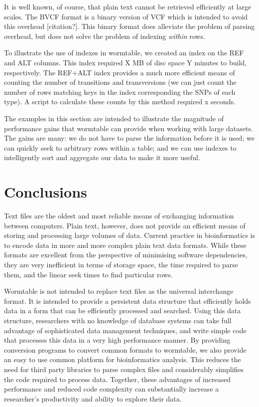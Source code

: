 \documentclass{bioinfo}
\begin{document}
It is well known, of course, that plain text cannot be retrieved 
efficiently at large scales. The BVCF format is a binary version 
of VCF which is intended to avoid this overhead [citation?]. 
This binary format does alleviate the problem of parsing overhead,
but does not solve the problem of indexing \emph{within} rows.

To illustrate the use of indexes in wormtable, we created an index 
on the REF and ALT columns. This index required X MB of disc space 
Y minutes to build, respectively. The REF+ALT index provides a much more 
efficient means of counting the number of transitions and transversions 
(we can just count the number of rows matching keys in the index 
corresponding the SNPs of each type). A script to calculate these 
counts by this method required x seconds. 

The examples in this section are intended to illustrate the 
magnitude of performance gains that wormtable can provide 
when working with large datasets. The gains are many: we 
do not have to parse the information before it is used;
we can quickly seek to arbitrary rows within a table; and 
we can use indexes to intelligently sort and aggregate our
data to make it more useful.

\section{Conclusions}
Text files are the oldest and most reliable means of exchanging 
information between computers. Plain text, however, does not provide an efficient 
means of storing and processing large volumes of data. Current practice 
in bioinformatics is to encode data in more and more complex plain 
text data formats. While these formats are excellent from the perspective 
of minimising software dependencies, they are very inefficient in terms of 
storage space, the time required to parse them, and the linear
seek times to find particular rows.

Wormtable is not intended to replace text files as the universal 
interchange format. It is intended to provide a persistent data structure 
that efficiently holds data in a form that can be efficiently processed 
and searched. Using this data structure, researchers with no knowledge of 
database systems can take full advantage of sophisticated 
data management techniques, and write simple code that processes this 
data in a very high performance manner. 
By providing conversion programs to convert 
common formats to wormtable, we also provide an easy to 
use common platform for 
bioinformatics analysis. This reduces the need for third party libraries 
to parse complex files and considerably simplifies the code required 
to process data.
Together, these advantages of increased performance and reduced 
code complexity can substantially increase a researcher's 
productivity and ability to explore their data.
\end{document}
